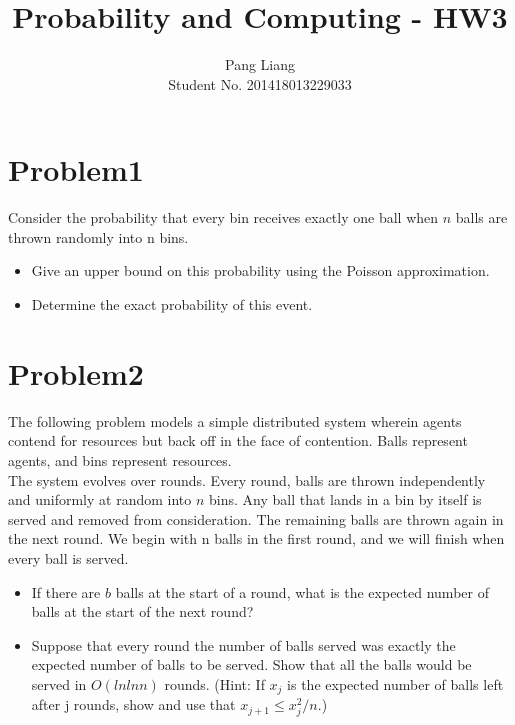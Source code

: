 \documentclass[12pt]{article}
\title{Probability and Computing - HW3}
\author{Pang Liang\\ Student No. 201418013229033}
\begin{document}
\maketitle

\section{Problem1}
Consider the probability that every bin receives exactly one ball when $n$ balls are thrown randomly into n bins.
\begin{itemize}
\item Give an upper bound on this probability using the Poisson approximation.
\item Determine the exact probability of this event.
\end{itemize}

\section{Problem2}
The following problem models a simple distributed system wherein agents contend for resources but back off in the face of contention. Balls represent agents, and bins represent resources.\\
The system evolves over rounds. Every round, balls are thrown independently and uniformly at random into $n$ bins. Any ball that lands in a bin by itself is served and removed from consideration. The remaining balls are thrown again in the next round. We begin with n balls in the first round, and we will finish when every ball is served.
\begin{itemize}
\item If there are $b$ balls at the start of a round, what is the expected number of balls at the start of the next round?
\item Suppose that every round the number of balls served was exactly the expected number of balls to be served. Show that all the balls would be served in $O(ln ln n)$ rounds. (Hint: If $x_j$ is the expected number of balls left after j rounds, show and use that $x_{j+1} \le x^2_j/n$.)

\end{itemize}
\end{document}
